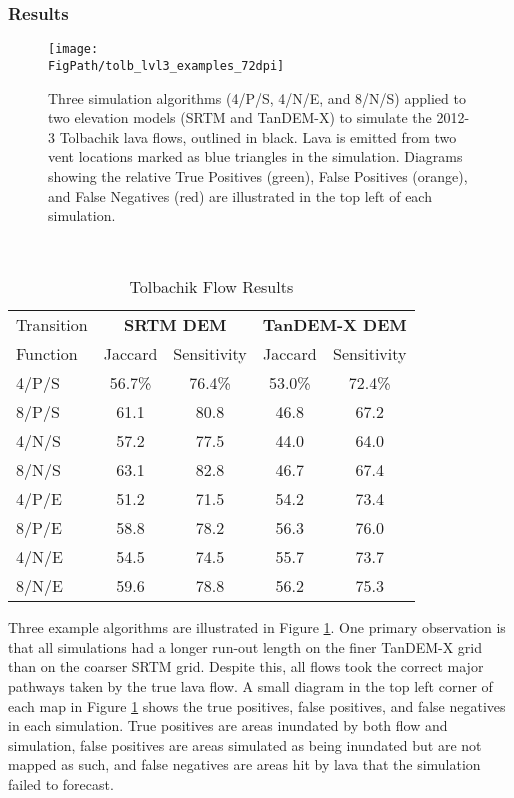 	\subsubsection{Results}
	
	\begin{figure}[!h]
			\centering
			\texttt{[image: \\FigPath/tolb\_lvl3\_examples\_72dpi]}
			\caption[Three simulation algorithms (4/P/S, 4/N/E, and 8/N/S) applied to two elevation models (SRTM and TanDEM-X) to simulate the 2012-3 Tolbachik lava flows, outlined in black]{Three simulation algorithms (4/P/S, 4/N/E, and 8/N/S) applied to two elevation models (SRTM and TanDEM-X) to simulate the 2012-3 Tolbachik lava flows, outlined in black. Lava is emitted from two vent locations marked as blue triangles in the simulation. Diagrams showing the relative True Positives (green), False Positives (orange), and False Negatives (red) are illustrated in the top left of each simulation.}
			\label{fig:tolbachik}
		\end{figure}
	
	
		\begin{table}[h]
		\centering
		\caption{Tolbachik Flow Results}\\
			\begin{tabular}{l c c | c c}
				\toprule
				Transition&\multicolumn{2}{c}{\textbf{SRTM DEM}}&\multicolumn{2}{c}{\textbf{TanDEM-X DEM}}\\
				Function& Jaccard & Sensitivity& Jaccard & Sensitivity\\
				\midrule
				4/P/S & 56.7\%& 76.4\%& 53.0\%& 72.4\% \\
				8/P/S & 61.1  & 80.8  & 46.8  & 67.2   \\
				4/N/S & 57.2  & 77.5  & 44.0  & 64.0   \\
				8/N/S & 63.1  & 82.8  & 46.7  & 67.4   \\
				4/P/E & 51.2  & 71.5  & 54.2  & 73.4   \\
				8/P/E & 58.8  & 78.2  & 56.3  & 76.0   \\
				4/N/E & 54.5  & 74.5  & 55.7  & 73.7   \\
				8/N/E & 59.6  & 78.8  & 56.2  & 75.3   \\
				\bottomrule
			\end{tabular}
			\label{tab_tolbflowresults}
		\end{table}
	
	Three example algorithms are illustrated in Figure \ref{fig:tolbachik}. One primary observation is that all simulations had a longer run-out length on the finer TanDEM-X grid than on the coarser SRTM grid. Despite this, all flows took the correct major pathways taken by the true lava flow. A small diagram in the top left corner of each map in Figure \ref{fig:tolbachik} shows the true positives, false positives, and false negatives in each simulation. True positives are areas inundated by both flow and simulation, false positives are areas simulated as being inundated but are not mapped as such, and false negatives are areas hit by lava that the simulation failed to forecast. 
		
